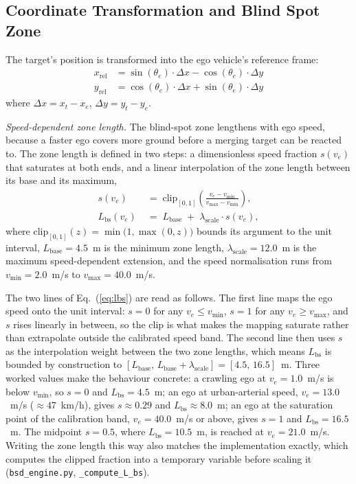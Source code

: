 \documentclass[sn-mathphys-num,Numbered,iicol]{sn-jnl}
\begin{document}
\subsection{Coordinate Transformation and Blind Spot Zone}\label{sec:frame}
The target's position is transformed into the ego vehicle's reference frame:
\begin{align}
  x_{\mathrm{rel}} &= \sin(\theta_e)\cdot\Delta x - \cos(\theta_e)\cdot\Delta y \\
  y_{\mathrm{rel}} &= \cos(\theta_e)\cdot\Delta x + \sin(\theta_e)\cdot\Delta y
\end{align}
where $\Delta x = x_t - x_e$, $\Delta y = y_t - y_e$.

\medskip\noindent
\emph{Speed-dependent zone length.} The blind-spot zone lengthens with ego speed, because a faster ego covers more ground before a merging target can be reacted to. The zone length is defined in two steps: a dimensionless speed fraction $s(v_e)$ that saturates at both ends, and a linear interpolation of the zone length between its base and its maximum,
\begin{equation}
\label{eq:lbs}
\begin{aligned}
  s(v_e)             \;&=\; \mathrm{clip}_{[0,1]}\!\left(
                              \frac{v_e - v_{\min}}{v_{\max} - v_{\min}}
                            \right), \\[4pt]
  L_{\mathrm{bs}}(v_e) \;&=\; L_{\mathrm{base}}
                            \;+\; \lambda_{\mathrm{scale}}\cdot s(v_e),
\end{aligned}
\end{equation}
where $\mathrm{clip}_{[0,1]}(z) = \min\bigl(1,\max(0,z)\bigr)$ bounds its argument to the unit interval, $L_{\mathrm{base}} = 4.5$~m is the minimum zone length, $\lambda_{\mathrm{scale}} = 12.0$~m is the maximum speed-dependent extension, and the speed normalisation runs from $v_{\min} = 2.0$~m/s to $v_{\max} = 40.0$~m/s.

The two lines of Eq.~(\ref{eq:lbs}) are read as follows. The first line maps the ego speed onto the unit interval: $s = 0$ for any $v_e \le v_{\min}$, $s = 1$ for any $v_e \ge v_{\max}$, and $s$ rises linearly in between, so the clip is what makes the mapping saturate rather than extrapolate outside the calibrated speed band. The second line then uses $s$ as the interpolation weight between the two zone lengths, which means $L_{\mathrm{bs}}$ is bounded by construction to $[L_{\mathrm{base}},\, L_{\mathrm{base}} + \lambda_{\mathrm{scale}}] = [4.5,\, 16.5]$~m. Three worked values make the behaviour concrete: a crawling ego at $v_e = 1.0$~m/s is below $v_{\min}$, so $s = 0$ and $L_{\mathrm{bs}} = 4.5$~m; an ego at urban-arterial speed, $v_e = 13.0$~m/s ($\approx 47$~km/h), gives $s \approx 0.29$ and $L_{\mathrm{bs}} \approx 8.0$~m; an ego at the saturation point of the calibration band, $v_e = 40.0$~m/s or above, gives $s = 1$ and $L_{\mathrm{bs}} = 16.5$~m. The midpoint $s = 0.5$, where $L_{\mathrm{bs}} = 10.5$~m, is reached at $v_e = 21.0$~m/s. Writing the zone length this way also matches the implementation exactly, which computes the clipped fraction into a temporary variable before scaling it (\texttt{bsd\_engine.py}, \texttt{\_compute\_L\_bs}).
\end{document}
